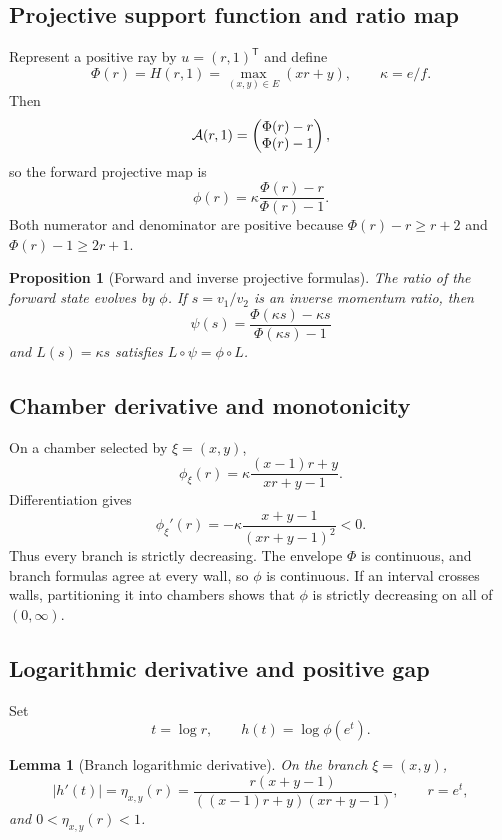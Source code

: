 \documentclass[11pt]{article}
\newtheorem{proposition}[theorem]{Proposition}
\newtheorem{lemma}[theorem]{Lemma}
\theoremstyle{definition}
\theoremstyle{remark}
\begin{document}
\subsection{Projective support function and ratio map}

Represent a positive ray by \(u=(r,1)^{\mathsf T}\) and define
\[
\Phi(r)=H(r,1)=\max_{(x,y)\in E}(xr+y),\qquad \kappa=e/f.
\]
Then
\[
\mathcal{A}(r,1)=
\begin{pmatrix}\Phi(r)-r\\\Phi(r)-1\end{pmatrix},
\]
so the forward projective map is
\[
\phi(r)=\kappa\frac{\Phi(r)-r}{\Phi(r)-1}.
\]
Both numerator and denominator are positive because
\(\Phi(r)-r\geq r+2\) and \(\Phi(r)-1\geq2r+1\).

\begin{proposition}[Forward and inverse projective formulas]
\label{prop:projective}
The ratio of the forward state evolves by \(\phi\).  If
\(s=v_1/v_2\) is an inverse momentum ratio, then
\[
\psi(s)=\frac{\Phi(\kappa s)-\kappa s}
{\Phi(\kappa s)-1}
\]
and \(L(s)=\kappa s\) satisfies \(L\circ\psi=\phi\circ L\).
\end{proposition}

\subsection{Chamber derivative and monotonicity}

On a chamber selected by \(\xi=(x,y)\),
\[
\phi_\xi(r)=\kappa
\frac{(x-1)r+y}{xr+y-1}.
\]
Differentiation gives
\[
\phi_\xi'(r)
=-\kappa\frac{x+y-1}{(xr+y-1)^2}<0.
\]
Thus every branch is strictly decreasing.  The envelope \(\Phi\) is
continuous, and branch formulas agree at every wall, so \(\phi\) is
continuous.  If an interval crosses walls, partitioning it into chambers
shows that \(\phi\) is strictly decreasing on all of \((0,\infty)\).

\subsection{Logarithmic derivative and positive gap}

Set
\[
t=\log r,\qquad h(t)=\log\phi(e^t).
\]

\begin{lemma}[Branch logarithmic derivative]\label{lem:logderivative}
On the branch \(\xi=(x,y)\),
\[
|h'(t)|=\eta_{x,y}(r)
=\frac{r(x+y-1)}
{((x-1)r+y)(xr+y-1)},
\qquad r=e^t,
\]
and \(0<\eta_{x,y}(r)<1\).
\end{lemma}
\end{document}
